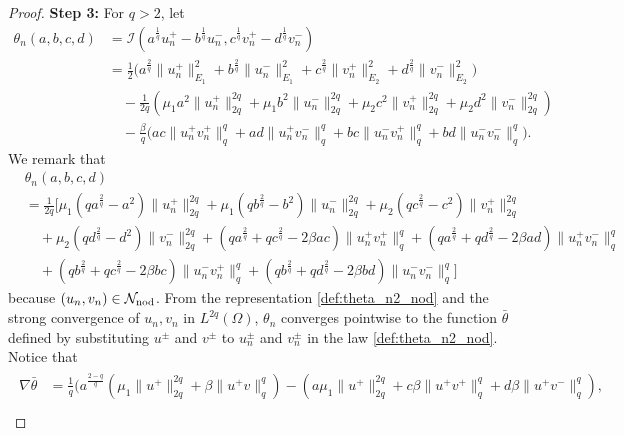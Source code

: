 \documentclass[reqno]{amsart}
\begin{document}
\begin{proof}
\noindent\textbf{Step 3:} For $q>2$, let
\begin{equation} \label{def:theta_n_nod}
\begin{split}
  \theta_n(a,b,c,d)
&=  \mathcal I (a^{\frac{1}{q}}u_n^+-b^{\frac{1}{q}}u_n^-,c^{\frac{1}q}v_n^+
-d^{\frac{1}{q}}v_n^-)  \\
&= \frac{1}2 \Big( a^{\frac{2}q}\|u^+_n\|_{E_1}^2 + b^{\frac{2}q}\|u^-_n\|_{E_1}^2
  + c^{\frac{2}q}\|v_n^+\|_{E_2}^2 + d^{\frac{2}q}\|v_n^-\|_{E_2}^2 \Big)
  \\
&\quad - \frac{1}{2q} \left( \mu_1 a^2 \|u_n^+ \|_{2q}^{2q} +\mu_1 b^2 \|u_n^- \|_{2q}^{2q}
 + \mu_2 c^2\|v_n^+\|_{2q}^{2q} +\mu_2 d^2\|v_n^-\|_{2q}^{2q} \right)
  \\
&\quad -\frac{\beta}{q} \Big( ac \|u_n^+v_n^+\|_q^q +  ad \|u_n^+v_n^-\|_q^q
+ bc \|u_n^-v_n^+\|_q^q +  bd \|u_n^-v_n^-\|_q^q \Big) .
\end{split}
\end{equation}
We remark that
 \begin{equation} \label{def:theta_n2_nod}
\begin{split}
&\theta_n(a,b,c,d) \\
&= \frac{1}{2q} \Big[ \mu_1 (q  a^{\frac{2}q} \!-a^2) \|u_n^+\|_{2q}^{2q}
  + \mu_1 (q  b^{\frac{2}q} \!-b^2) \|u_n^-\|_{2q}^{2q}
  +\mu_2 (q  c^{\frac{2}q} \!-c^2) \|v_n^+\|_{2q}^{2q}  \\
&\quad + \mu_2 (q  d^{\frac{2}q} \!-d^2) \|v_n^-\|_{2q}^{2q}
  + ( q a^{\frac{2}q} +  qc^{\frac{2}q} - 2\beta ac)
   \|u_n^+v_n^+\|_q^q  + ( q a^{\frac{2}q} +  qd^{\frac{2}q} - 2\beta ad)
    \|u_n^+v_n^-\|_q^q \\
&\quad  + ( q b^{\frac{2}q} +  qc^{\frac{2}q} - 2\beta bc)  \|u_n^-v_n^+\|_q^q
  + ( q b^{\frac{2}q} +  qd^{\frac{2}q} - 2\beta bd)  \|u_n^-v_n^-\|_q^q \Big]
\end{split}
\end{equation}
because $(u_n,v_n)\in \mathcal N_{\rm nod}$.
From the representation \eqref{def:theta_n2_nod} and the strong convergence of
$u_n, v_n$ in $L^{2q}(\Omega)$, $\theta_n$ converges pointwise to the function
$\bar\theta$ defined by substituting $u^{\pm}$ and $v^{\pm}$ to $u^{\pm}_n$ and
$v^{\pm}_n$ in the law \eqref{def:theta_n2_nod}.
Notice that
\begin{gather*}
\begin{aligned}
\nabla\bar\theta
&= \frac{1}{q} \Big(
 a^{\frac{2-q}q}(\mu_1\|u^+\|_{2q}^{2q} +\beta\|u^+v\|_q^q)
 - ( a\mu_1\|u^+\|_{2q}^{2q} +c \beta \|u^+v^+\|_q^q +d\beta \|u^+v^-\|_q^q), \\

\end{aligned}
\end{gather*}
\end{proof}
\end{document}
